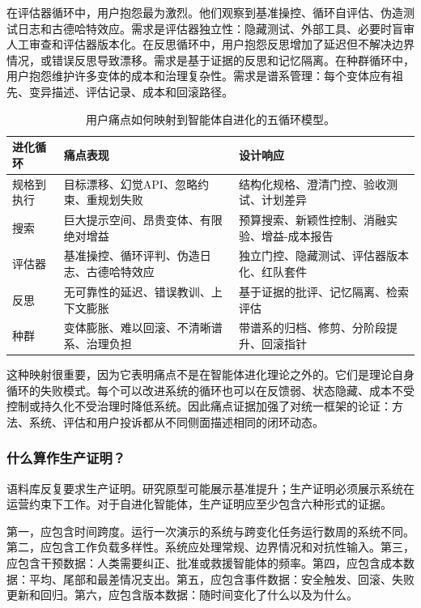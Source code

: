 在评估器循环中，用户抱怨最为激烈。他们观察到基准操控、循环自评估、伪造测试日志和古德哈特效应。需求是评估器独立性：隐藏测试、外部工具、必要时盲审人工审查和评估器版本化。在反思循环中，用户抱怨反思增加了延迟但不解决边界情况，或错误反思导致漂移。需求是基于证据的反思和记忆隔离。在种群循环中，用户抱怨维护许多变体的成本和治理复杂性。需求是谱系管理：每个变体应有祖先、变异描述、评估记录、成本和回滚路径。

\begin{table}[htbp]
\centering
\small
\begin{tabular}{p{}p{}p{}}
\toprule
\textbf{进化循环} & \textbf{痛点表现} & \textbf{设计响应} \\
\midrule
规格到执行 & 目标漂移、幻觉API、忽略约束、重规划失败 & 结构化规格、澄清门控、验收测试、计划差异 \\
搜索 & 巨大提示空间、昂贵变体、有限绝对增益 & 预算搜索、新颖性控制、消融实验、增益-成本报告 \\
评估器 & 基准操控、循环评判、伪造日志、古德哈特效应 & 独立门控、隐藏测试、评估器版本化、红队套件 \\
反思 & 无可靠性的延迟、错误教训、上下文膨胀 & 基于证据的批评、记忆隔离、检索评估 \\
种群 & 变体膨胀、难以回滚、不清晰谱系、治理负担 & 带谱系的归档、修剪、分阶段提升、回滚指针 \\
\bottomrule
\end{tabular}
\caption{用户痛点如何映射到智能体自进化的五循环模型。}
\label{tab:ch7-loop-painpoint-map}
\end{table}

这种映射很重要，因为它表明痛点不是在智能体进化理论之外的。它们是理论自身循环的失败模式。每个可以改进系统的循环也可以在反馈弱、状态隐藏、成本不受控制或持久化不受治理时降低系统。因此痛点证据加强了对统一框架的论证：方法、系统、评估和用户投诉都从不同侧面描述相同的闭环动态。

\subsubsection{什么算作生产证明？}
\label{sec:ch7-production-proof}

语料库反复要求生产证明。研究原型可能展示基准提升；生产证明必须展示系统在运营约束下工作。对于自进化智能体，生产证明应至少包含六种形式的证据。

第一，应包含时间跨度。运行一次演示的系统与跨变化任务运行数周的系统不同。第二，应包含工作负载多样性。系统应处理常规、边界情况和对抗性输入。第三，应包含干预数据：人类需要纠正、批准或救援智能体的频率。第四，应包含成本数据：平均、尾部和最差情况支出。第五，应包含事件数据：安全触发、回滚、失败更新和回归。第六，应包含版本数据：随时间变化了什么以及为什么。

